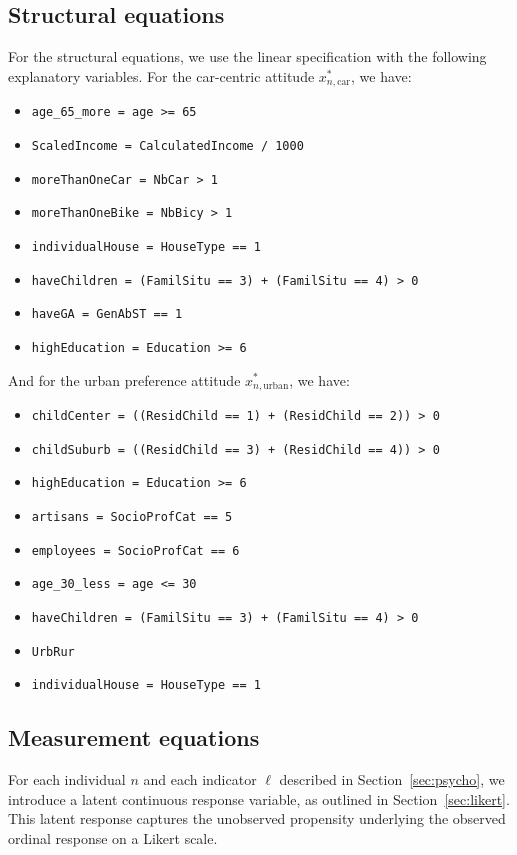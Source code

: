 \documentclass[12pt,a4paper]{article}
\begin{document}
\subsection{Structural equations}

For the structural equations, we use the linear specification  with the following explanatory variables.
For the car-centric attitude $x_{n,\text{car}}^*$, we have:
\begin{itemize}
\item \lstinline $age_65_more = age >= 65$
\item \lstinline $ScaledIncome = CalculatedIncome / 1000$
\item \lstinline $moreThanOneCar = NbCar > 1$
\item \lstinline $moreThanOneBike = NbBicy > 1$
\item \lstinline $individualHouse = HouseType == 1$
\item \lstinline $haveChildren = (FamilSitu == 3) + (FamilSitu == 4) > 0$
\item \lstinline $haveGA = GenAbST == 1$
\item \lstinline $highEducation = Education >= 6$
\end{itemize}
And for the urban preference attitude $x_{n,\text{urban}}^*$, we have:
\begin{itemize}
\item \lstinline $childCenter = ((ResidChild == 1) + (ResidChild == 2)) > 0$
\item \lstinline $childSuburb = ((ResidChild == 3) + (ResidChild == 4)) > 0$
\item \lstinline $highEducation = Education >= 6$
\item \lstinline $artisans = SocioProfCat == 5$
\item \lstinline $employees = SocioProfCat == 6$
\item \lstinline $age_30_less = age <= 30$
\item \lstinline $haveChildren = (FamilSitu == 3) + (FamilSitu == 4) > 0$
\item \lstinline $UrbRur$
\item \lstinline $individualHouse = HouseType == 1$
\end{itemize}

\subsection{Measurement equations}

For each individual \( n \) and each indicator \( \ell \) described in
Section~\ref{sec:psycho}, we introduce a latent continuous response
variable, as outlined in Section~\ref{sec:likert}. This latent
response captures the unobserved propensity underlying the observed
ordinal response on a Likert scale.
\end{document}
